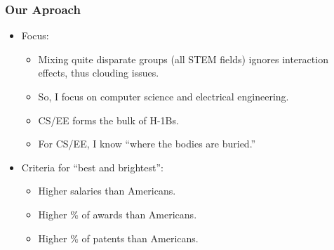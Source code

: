 \documentclass{beamer}
\begin{document}
\begin{frame}
\frametitle{Our Aproach}
\pause

\begin{itemize}

\item Focus:
\pause

   \begin{itemize}

   \item Mixing quite disparate groups (all STEM fields) ignores
   interaction effects, thus clouding issues.
   \pause

   \item So, I focus on computer science and electrical engineering.
   \pause

   \item CS/EE forms the bulk of H-1Bs.
   \pause

   \item For CS/EE, I know ``where the bodies are buried.''
   \pause

   \end{itemize}

\item Criteria for ``best and brightest'':
\pause

   \begin{itemize}

   \item Higher salaries than Americans. 
   \pause

   \item Higher \% of awards than Americans.
   \pause

   \item Higher \% of patents than Americans.

   \end{itemize}

\end{itemize}

\end{frame}
\end{document}
